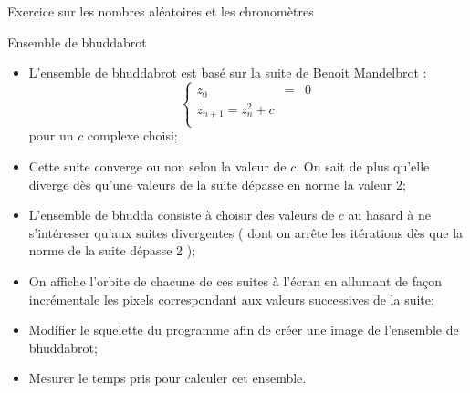 \documentclass[handout,10pt]{beamer}
\begin{document}
\begin{frame}[fragile]{Exercice sur les nombres aléatoires et les chronomètres}
\tiny
\begin{exampleblock}{Ensemble de bhuddabrot}
\begin{itemize}
\item L'ensemble de bhuddabrot est basé sur la suite de Benoit Mandelbrot : 
\[
\left\{\begin{array}{lcr}
z_{0} & = & 0 \\
z_{n+1} = z_{n}^{2} + c \\
\end{array}\right.
\]
pour un $c$  complexe choisi;
\item Cette suite converge ou non selon la valeur de $c$. On sait de plus qu'elle diverge dès qu'une valeurs de la suite dépasse en norme la valeur 2;
\item L'ensemble de bhudda consiste à choisir des valeurs de $c$ au hasard  à ne s'intéresser qu'aux suites divergentes ( dont on arrête les itérations dès que la norme de la suite dépasse 2 );
\item On affiche l'orbite de chacune de ces suites à l'écran en allumant de façon incrémentale les pixels correspondant aux valeurs successives de la suite;
\item Modifier le squelette du programme afin de créer une image de l'ensemble de bhuddabrot;
\item Mesurer le temps pris pour calculer cet ensemble.
\end{itemize}
\end{exampleblock}
\end{frame}
\end{document}
